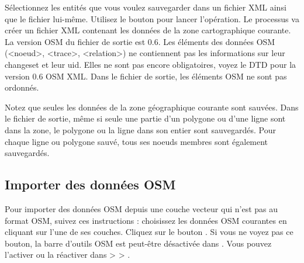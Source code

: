 Sélectionnez les entités que vous voulez sauvegarder dans un fichier XML ainsi que le fichier lui-même. Utilisez le bouton  pour lancer l'opération. Le processus va créer un fichier XML contenant les données de la zone cartographique courante. La version OSM du fichier de sortie est 0.6. Les éléments des données OSM (<noeud>, <trace>, <relation>) ne contiennent pas les informations sur leur changeset et leur uid. Elles ne sont pas encore obligatoires, voyez le DTD pour la version 0.6 OSM XML. Dans le fichier de sortie, les éléments OSM ne sont pas ordonnés.

Notez que seules les données de la zone géographique courante sont sauvées. Dans le fichier de sortie, même si seule une partie d'un polygone ou d'une ligne sont dans la zone, le polygone ou la ligne dans son entier sont sauvegardés. Pour chaque ligne ou polygone sauvé, tous ses noeuds membres sont également sauvegardés.

\subsection{Importer des données OSM} 

Pour importer des données OSM depuis une couche vecteur qui n'est pas au format OSM, suivez ces instructions : choisissez les données OSM courantes en cliquant sur l'une de ses couches. Cliquez sur le bouton . Si vous ne voyez pas ce bouton, la barre d'outils OSM est peut-être désactivée dans \qg. Vous pouvez l'activer ou la réactiver dans  >  > .

